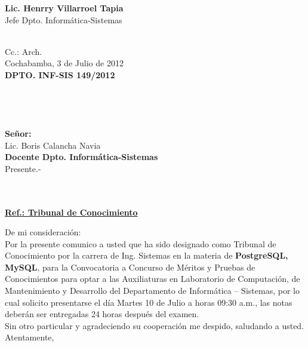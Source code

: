 \documentclass[letterpaper,11pt]{letter}
\begin{document}
\vspace{3.5cm}
\begin{center}
\begin{minipage}[b]{0.5\textwidth}
\begin{center}
{\bf Lic. Henrry Villarroel Tapia}\\
Jefe Dpto. Informática-Sistemas\\
\end{center}
\end{minipage}
\end{center}
~\\
Cc.: Arch.\\
\newpage
Cochabamba, 3 de Julio de 2012~\\
 \textbf{DPTO. INF-SIS 149/2012}\\
~\\
~\\
~\\
~\\
 \textbf{Señor:}~\\
Lic. Boris Calancha Navia~\\
 \textbf{Docente Dpto. Informática-Sistemas}~\\
Presente.-\\
~\\
~\\
\begin{center}
\underline{ \textbf{Ref.: Tribunal de Conocimiento}}
\end{center}
De mi consideración:\\
Por la presente comunico a usted que ha sido designado como Tribunal de Conocimiento por la carrera de Ing. Sistemas en la materia de \textbf{PostgreSQL, MySQL}, para la Convocatoria a Concurso de Méritos y Pruebas de Conocimientos para optar a las Auxiliaturas en Laboratorio de Computación, de Mantenimiento y Desarrollo del Departamento de Informática – Sistemas, por lo cual solicito presentarse el día Martes 10 de Julio a horas 09:30 a.m., las notas deberán ser entregadas 24 horas después del examen.\\
Sin otro particular y agradeciendo su cooperación me despido, saludando a usted.\\
Atentamente,\\
\end{document}

